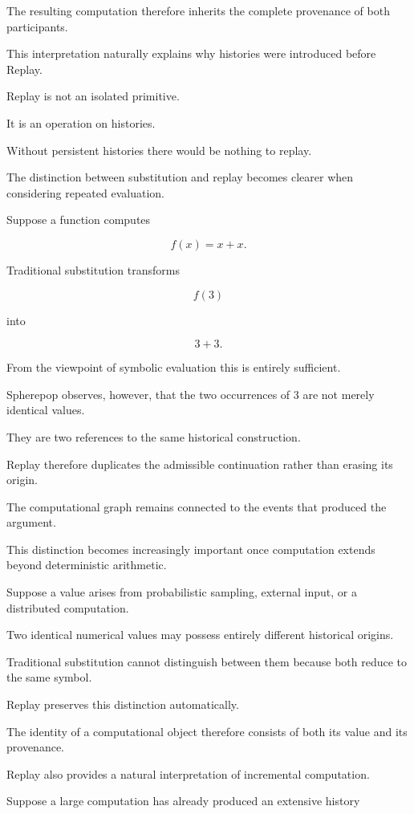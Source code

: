 \documentclass[12pt,oneside]{article}
\theoremstyle{definition}
\theoremstyle{remark}
\begin{document}
The resulting computation therefore inherits the complete provenance of both
participants.

This interpretation naturally explains why histories were introduced before
Replay.

Replay is not an isolated primitive.

It is an operation on histories.

Without persistent histories there would be nothing to replay.

The distinction between substitution and replay becomes clearer when
considering repeated evaluation.

Suppose a function computes

\[
f(x)=x+x.
\]

Traditional substitution transforms

\[
f(3)
\]

into

\[
3+3.
\]

From the viewpoint of symbolic evaluation this is entirely sufficient.

Spherepop observes, however, that the two occurrences of \(3\) are not merely
identical values.

They are two references to the same historical construction.

Replay therefore duplicates the admissible continuation rather than erasing
its origin.

The computational graph remains connected to the events that produced the
argument.

This distinction becomes increasingly important once computation extends
beyond deterministic arithmetic.

Suppose a value arises from probabilistic sampling, external input, or a
distributed computation.

Two identical numerical values may possess entirely different historical
origins.

Traditional substitution cannot distinguish between them because both reduce
to the same symbol.

Replay preserves this distinction automatically.

The identity of a computational object therefore consists of both its value
and its provenance.

Replay also provides a natural interpretation of incremental computation.

Suppose a large computation has already produced an extensive history
\end{document}
